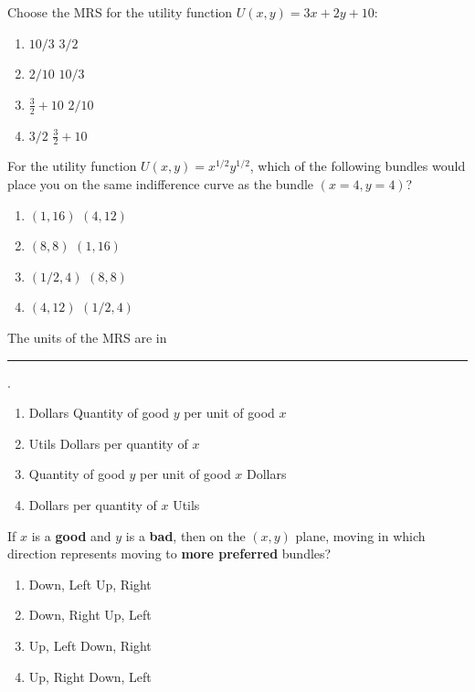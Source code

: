 \begin{question}[type=exam]{4}
  Choose the MRS for the utility function $U(x,y) = 3x + 2y + 10$:
  \begin{enumerate}[label=\alph*), noitemsep]
    \item \vary
      {$10/3$}
      {$3/2$} %
    \item \vary
      {$2/10$}
      {$10/3$}
    \item \vary
      {$\frac{3}{2} + 10$}
      {$2/10$}
    \item \vary
      {$3/2$} %
      {$\frac{3}{2} + 10$}
  \end{enumerate}
\end{question}

\begin{question}[type=exam]{4}
  For the utility function $U(x,y) = x^{1/2}y^{1/2}$, 
  which of the following bundles would place you on the same indifference curve as the bundle $(x=4,y=4)$?
  \begin{enumerate}[label=\alph*), noitemsep]
    \item \vary
    {$(1,16)$} %
    {$(4,12)$}
    \item \vary
    {$(8,8)$}
    {$(1,16)$} %
    \item \vary
    {$(1/2,4)$}
    {$(8,8)$}
    \item \vary
    {$(4,12)$}
    {$(1/2,4)$}
  \end{enumerate}
\end{question}

\begin{question}[type=exam]{4}
  The units of the MRS are in \rule{1cm}{0.15mm}.
  \begin{enumerate}[label=\alph*), noitemsep]
    \item \vary
      {Dollars}
      {Quantity of good $y$ per unit of good $x$} %
    \item \vary
      {Utils}
      {Dollars per quantity of $x$}
    \item \vary
      {Quantity of good $y$ per unit of good $x$} %
      {Dollars}
    \item \vary
      {Dollars per quantity of $x$}
      {Utils}
  \end{enumerate}
\end{question}

\begin{question}[type=exam]{4}
  If $x$ is a \textbf{good} and $y$ is a \textbf{bad}, then on the $(x,y)$ plane, moving in which direction represents moving to \textbf{more preferred} bundles?
  \begin{enumerate}[label=\alph*), noitemsep]
    \item \vary
      {Down, Left}
      {Up, Right}
    \item \vary
      {Down, Right} %
      {Up, Left}
    \item \vary
      {Up, Left}
      {Down, Right} %
    \item \vary
      {Up, Right}
      {Down, Left}
  \end{enumerate}
\end{question}


